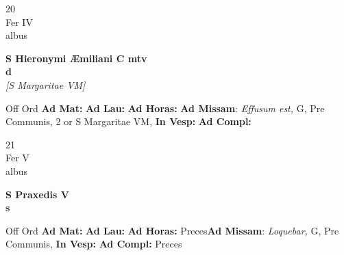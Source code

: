 \documentclass[10pt, openany]{book}
\begin{document}
        \begin{center}
            \begin{minipage}{3.5in}
                \vspace{2em}
                \begin{minipage}{0.5in}
                    {\Huge 20} \\
                    {\normalsize Fer IV} \\
                    {\normalsize albus}
                \end{minipage}
                \begin{minipage}{3.0in}
                    \textbf{ \large S Hieronymi Æmiliani C mtv \\
                    \textnormal{\normalsize d}} \\ \textit{[S Margaritae VM]} \\ 
                \end{minipage}
                \begin{justify}Off Ord
                    \textbf{Ad Mat: }
                    \textbf{Ad Lau: }
                    \textbf{Ad Horas: }\textbf{Ad Missam}: \textit{Effusum est,} G, Pre Communis, 2 or S Margaritae VM,  
                    \textbf{In Vesp: }
                    \textbf{Ad Compl: }
                \end{justify}
            \end{minipage}
        \end{center}
    
        \begin{center}
            \begin{minipage}{3.5in}
                \vspace{2em}
                \begin{minipage}{0.5in}
                    {\Huge 21} \\
                    {\normalsize Fer V} \\
                    {\normalsize albus}
                \end{minipage}
                \begin{minipage}{3.0in}
                    \textbf{ \large S Praxedis V \\
                    \textnormal{\normalsize s}} \\ 
                \end{minipage}
                \begin{justify}Off Ord
                    \textbf{Ad Mat: }
                    \textbf{Ad Lau: }
                    \textbf{Ad Horas: }Preces\textbf{Ad Missam}: \textit{Loquebar,} G, Pre Communis,  
                    \textbf{In Vesp: }
                    \textbf{Ad Compl: }Preces
                \end{justify}
            \end{minipage}
        \end{center}
    
\end{document}
